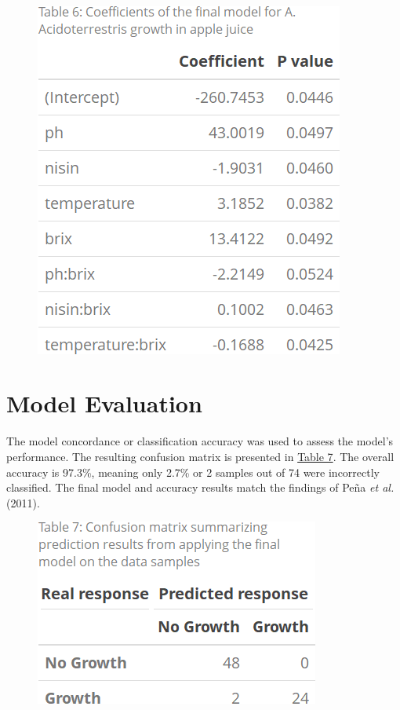 \documentclass[
  12pt,
]{article}
\begin{document}
\(~\)

\begin{figure}
\centering
\includegraphics{table6}
\caption*{}
\label{table6}
\end{figure}

\hypertarget{model-evaluation}{%
\section{Model Evaluation}\label{model-evaluation}}

The model concordance or classification accuracy was used to assess the
model's performance. The resulting confusion matrix is presented in
\hyperref[table7]{Table 7}. The overall accuracy is 97.3\%, meaning only
2.7\% or 2 samples out of 74 were incorrectly classified. The final
model and accuracy results match the findings of Peña \emph{et al.}
(2011).

\begin{figure}
\centering
\includegraphics{table7}
\caption*{}
\label{table7}
\end{figure}
\end{document}
